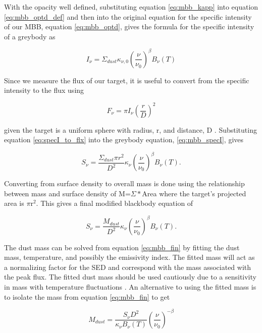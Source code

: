 With the opacity well defined, substituting equation \ref{eq:mbb_kapp} into equation \ref{eq:mbb_optd_def} and then into the original equation for the specific intensity of our MBB, equation \ref{eq:mbb_optd}, gives the formula for the specific intensity of a greybody as

\begin{equation}\label{eq:mbb_specI}
  I_\nu=\Sigma_{dust}\kappa_{\nu,0}\left(\frac{\nu}{\nu_0}\right)^\beta B_\nu\left(T\right)
\end{equation}

\noindent  Since we measure the flux of our target, it is useful to convert from the specific intensity to the flux using 

\begin{equation}\label{eq:specI_to_flx}
  F_\nu = \pi I_\nu \left(\frac{r}{D}\right)^2
\end{equation}

\noindent given the target is a uniform sphere with radius, r, and distance, D \citep{rybicki1986}.  Substituting equation \ref{eq:specI_to_flx} into the greybody equation, \ref{eq:mbb_specI}, gives

\begin{equation}\label{eq:mbb_sd}
  S_\nu=\frac{\Sigma_{dust}\pi r^2}{D^2}\kappa_\nu\left(\frac{\nu}{\nu_0}\right)^\beta B_\nu\left(T\right).
\end{equation}

Converting from surface density to overall mass is done using the relationship between mass and surface density of M=$\Sigma*$Area where the target's projected area is $\pi$r$^2$.  This gives a final modified blackbody equation of 

\begin{equation}\label{eq:mbb_fin}
  S_\nu=\frac{M_{dust}}{D^2}\kappa_\nu\left(\frac{\nu}{\nu_0}\right)^\beta B_\nu\left(T\right).
\end{equation}

The dust mass can be solved from equation \ref{eq:mbb_fin} by fitting the dust mass, temperature, and possibly the emissivity index.  The fitted mass will act as a normalizing factor for the SED and correspond with the mass associated with the peak flux.  The fitted dust mass should be used cautiously due to a sensitivity in mass with temperature fluctuations \citep{draine2007}. An alternative to using the fitted mass is to isolate the mass from equation \ref{eq:mbb_fin} to get 

\begin{equation}\label{eq:mbb_mass}
  M_{dust} = \frac{S_\nu D^2}{\kappa_\nu B_\nu\left(T\right)}\left(\frac{\nu}{\nu_0}\right)^{-\beta}
\end{equation}

